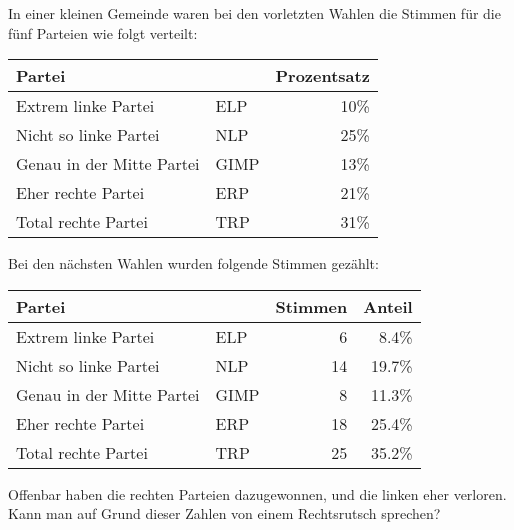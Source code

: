 In einer kleinen Gemeinde waren bei den vorletzten Wahlen die
Stimmen für die fünf Parteien wie folgt verteilt:
\begin{center}
\begin{tabular}{ll|r}
Partei                   &    &Prozentsatz\\
\hline
Extrem linke Partei      &ELP & 10\%\\
Nicht so linke Partei    &NLP & 25\%\\
Genau in der Mitte Partei&GIMP& 13\%\\
Eher rechte Partei       &ERP & 21\%\\
Total rechte Partei      &TRP & 31\%\\
\hline
\end{tabular}
\end{center}
Bei den nächsten Wahlen wurden folgende Stimmen gezählt:
\begin{center}
\begin{tabular}{ll|rr}
Partei                   &    &Stimmen&Anteil\\
\hline
Extrem linke Partei      &ELP &  6    & 8.4\%\\
Nicht so linke Partei    &NLP & 14    &19.7\%\\
Genau in der Mitte Partei&GIMP&  8    &11.3\%\\
Eher rechte Partei       &ERP & 18    &25.4\%\\
Total rechte Partei      &TRP & 25    &35.2\%\\
\hline
\end{tabular}
\end{center}
Offenbar haben die rechten Parteien dazugewonnen, und die linken
eher verloren.
Kann man auf Grund dieser Zahlen von einem Rechtsrutsch sprechen?

